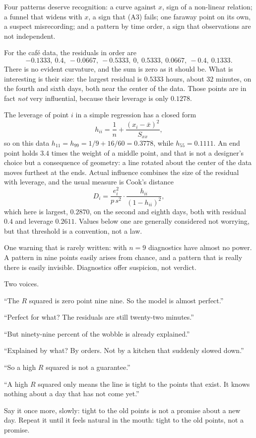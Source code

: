 Four patterns deserve recognition: a curve against $x$, sign of a non-linear relation; a funnel
that widens with $x$, a sign that (A3) fails; one faraway point on its own, a suspect
misrecording; and a pattern by time order, a sign that observations are not independent.

For the café data, the residuals in order are
\[
-0.1333,\ 0.4,\ -0.0667,\ -0.5333,\ 0,\ 0.5333,\ 0.0667,\ -0.4,\ 0.1333 .
\]
There is no evident curvature, and the sum is zero as it should be. What is interesting is their
size: the largest residual is $0.5333$ hours, about $32$ minutes, on the fourth and sixth days,
both near the center of the data. Those points are in fact \emph{not} very influential, because
their leverage is only $0.1278$.

The leverage of point $i$ in a simple regression has a closed form
\[
h_{ii}=\frac1n+\frac{(x_i-\bar x)^2}{S_{xx}},
\]
so on this data $h_{11}=h_{99}=1/9+16/60=0.3778$, while $h_{55}=0.1111$. An end point holds
$3.4$ times the weight of a middle point, and that is not a designer's choice but a consequence
of geometry: a line rotated about the center of the data moves furthest at the ends. Actual
influence combines the size of the residual with leverage, and the usual measure is Cook's
distance
\[
D_i=\frac{e_i^2}{p\,s^2}\cdot\frac{h_{ii}}{(1-h_{ii})^2},
\]
which here is largest, $0.2870$, on the second and eighth days, both with residual $0.4$ and
leverage $0.2611$. Values below one are generally considered not worrying, but that threshold
is a convention, not a law.

One warning that is rarely written: with $n=9$ diagnostics have almost no power. A pattern in
nine points easily arises from chance, and a pattern that is really there is easily invisible.
Diagnostics offer suspicion, not verdict.

\begin{bacakeras}
Two voices.

``The $R$ squared is zero point nine nine. So the model is almost perfect.''

``Perfect for what? The residuals are still twenty-two minutes.''

``But ninety-nine percent of the wobble is already explained.''

``Explained by what? By orders. Not by a kitchen that suddenly slowed down.''

``So a high $R$ squared is not a guarantee.''

``A high $R$ squared only means the line is tight to the points that exist. It knows nothing
about a day that has not come yet.''

Say it once more, slowly: tight to the old points is not a promise about a new day. Repeat it
until it feels natural in the mouth: tight to the old points, not a promise.
\end{bacakeras}

